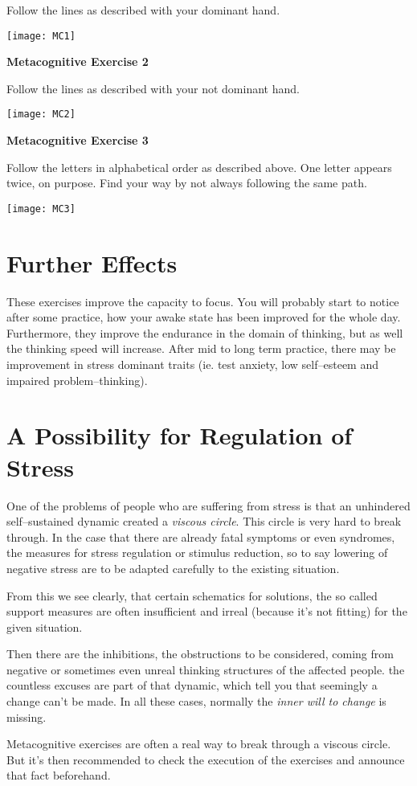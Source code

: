 \documentclass[../main.tex]{subfiles}
\begin{document}
\noindent Follow the lines as described with your dominant hand.

\noindent \texttt{[image: MC1]}

\newpage

\noindent \textbf{Metacognitive Exercise 2}

\noindent Follow the lines as described with your not dominant hand.

\noindent \texttt{[image: MC2]}

\newpage


\noindent \textbf{Metacognitive Exercise 3}

\noindent Follow the letters in alphabetical order as described above. One letter appears twice, on purpose. Find your way by not always following the same path.

\noindent \texttt{[image: MC3]}

\newpage

\section{Further Effects}

These exercises improve the capacity to {focus}. You will probably start to notice after some practice, how your awake state has been improved for the whole day.
Furthermore, they improve the endurance in the domain of thinking, but as well the {thinking speed will increase}.
After mid to long term practice, there may be improvement in {stress dominant traits} (ie. test anxiety, low self--esteem and impaired problem--thinking).

\section{A Possibility for Regulation of Stress}


One of the problems of people who are suffering from stress is that an unhindered self--sustained dynamic created a \emph{viscous circle}.
This circle is very hard to break through.
In the case that there are already fatal symptoms or even syndromes, the measures for stress regulation or stimulus reduction, so to say lowering of negative stress are to be adapted carefully to the existing situation.

From this we see clearly, that certain schematics for solutions, the so called support measures %
are often insufficient and irreal (because it's not fitting) for the given situation.

Then there are the inhibitions, the {obstructions} to be considered, coming from negative or sometimes even unreal thinking structures of the affected people. the countless  excuses are part of that dynamic, which tell you that seemingly a change can't be made. In all these cases, normally the \emph{inner will to change} is missing.

Metacognitive exercises are often a real way to break through a {viscous circle}. But it's then recommended to check the execution of the exercises and announce that fact beforehand. 
\end{document}
